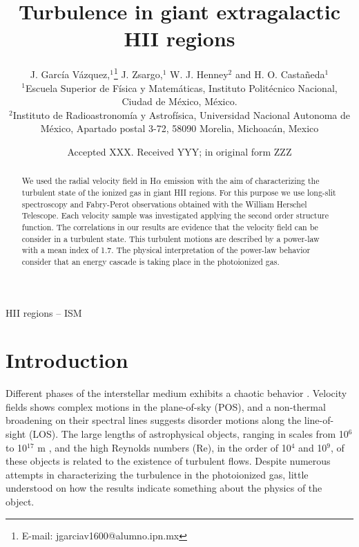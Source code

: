 \documentclass[fleqn,usenatbib]{mnras}
\title[Turbulence in GEHRs]{Turbulence in giant extragalactic HII regions}
\author[J. García-Vázquez et al.]{
J. García Vázquez,$^{1}$\thanks{E-mail: jgarciav1600@alumno.ipn.mx}
J. Zsargo,$^{1}$
W. J. Henney$^{2}$
and H. O. Castañeda$^{1}$
\\
$^{1}$Escuela Superior de Física y Matemáticas, Instituto Politécnico Nacional, Ciudad de México, México.\\
$^{2}$Instituto de Radioastronomía y Astrofísica, Universidad Nacional Autonoma de México, Apartado postal 3-72, 58090 Morelia, Michoacán, Mexico\\
}
\date{Accepted XXX. Received YYY; in original form ZZZ}
\begin{document}
\label{firstpage}
\pagerange{\pageref{firstpage}--\pageref{lastpage}}
\maketitle

\begin{abstract}

We used the radial velocity field in H$\alpha$ emission with the aim of characterizing the turbulent state of the ionized gas in giant HII regions. For this purpose we use long-slit spectroscopy and Fabry-Perot observations obtained with the William Herschel Telescope. Each velocity sample was investigated applying the second order structure function. The correlations in our results are evidence that the velocity field can be consider in a turbulent state. This turbulent motions are described by a power-law with a mean index of 1.7. The physical interpretation of the power-law behavior consider that an energy cascade is taking place in the photoionized gas.
\end{abstract}

\begin{keywords}
HII regions -- ISM
\end{keywords}



\section{Introduction}

Different phases of the interstellar medium exhibits a chaotic behavior \citep{franco1999interstellar,elmegreen2004interstellar,scalo2004interstellar}. Velocity fields shows complex motions in the plane-of-sky (POS), and a non-thermal broadening on their spectral lines suggests disorder motions along the line-of-sight (LOS). The large lengths of astrophysical objects, ranging in scales from 10$^{6}$ to 10$^{17}$ m \citep{chepurnov2010extending}, and the high Reynolds numbers (Re), in the order of 10$^{4}$ and 10$^{9}$, of these objects \citep{lagrois2011} is related to the existence of turbulent flows. Despite numerous attempts in characterizing the turbulence in the photoionized gas, little understood on how the results indicate something about the physics of the object.   
\end{document}
